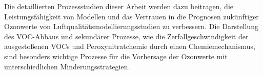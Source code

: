 Die detaillierten Prozessstudien dieser Arbeit werden dazu beitragen, die Leistungsfähigkeit von Modellen und das Vertrauen in die Prognosen zukünftiger Ozonwerte von Luftqualitätsmodellierungsstudien zu verbessern.
Die Darstellung des VOC-Abbaus und sekundärer Prozesse, wie die Zerfallgeschwindigkeit der ausgestoßenen VOCs und Peroxynitratchemie durch einen Chemiemechanismus, sind besonders wichtige Prozesse für die Vorhersage der Ozonwerte mit unterschiedlichen Minderungsstrategien.
